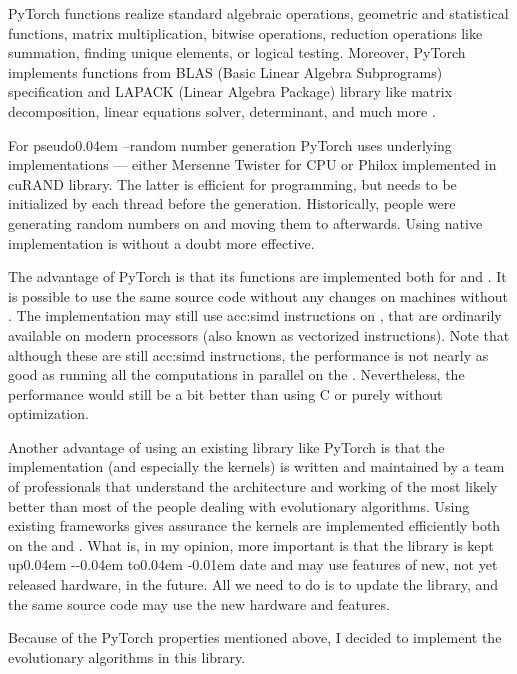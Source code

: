 PyTorch functions realize standard algebraic operations, geometric and statistical functions, matrix multiplication, bitwise operations, reduction operations like summation, finding unique elements, or logical testing. Moreover, PyTorch implements functions from BLAS (Basic Linear Algebra Subprograms) specification and LAPACK (Linear Algebra Package) library like matrix decomposition, linear equations solver, determinant, and much more \citep{PyTorchDoc}.

For pseudo\kern0.04em --random number generation PyTorch uses underlying implementations --- either Mersenne Twister for CPU or Philox implemented in cuRAND library. The latter is efficient for \cuda programming, but needs to be initialized by each thread before the generation. Historically, people were generating random numbers on \cpu and moving them to \gpu afterwards. Using native \cuda implementation is without a doubt more effective.

The advantage of PyTorch is that its functions are implemented both for \cpu and \gpuns. It is possible to use the same source code without any changes on machines without \gpuns. The implementation may still use \acrshort{acc:simd} instructions on \cpuns, that are ordinarily available on modern processors (also known as vectorized instructions). Note that although these are still \acrshort{acc:simd} instructions, the performance is not nearly as good as running all the computations in parallel on the \gpuns. Nevertheless, the performance would still be a bit better than using C or \cpp purely without optimization.

Another advantage of using an existing library like PyTorch is that the implementation (and especially the \cuda kernels) is written and maintained by a team of professionals that understand the architecture and working of the \gpu most likely better than most of the people dealing with evolutionary algorithms. Using existing frameworks gives assurance the kernels are implemented efficiently both on the \gpu and \cpuns. What is, in my opinion, more important is that the library is kept up\kern0.04em -\kern-0.04em to\kern0.04em -\kern0.01em date and may use features of new, not yet released hardware, in the future. All we need to do is to update the library, and the same source code may use the new hardware and features.

Because of the PyTorch properties mentioned above, I decided to implement the evolutionary algorithms in this library.




